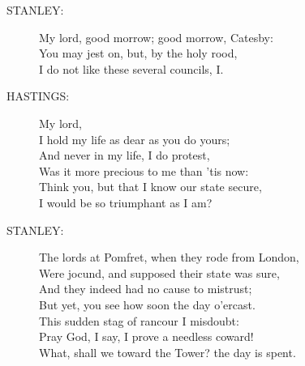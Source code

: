 \documentclass{article}
\begin{document}
\begin{description}
\item[STANLEY:] 
\hspace{1pt}My lord, good morrow; good morrow, Catesby:\\
\hspace{1pt}You may jest on, but, by the holy rood,\\
\hspace{1pt}I do not like these several councils, I.\\
\end{description}
\begin{description}
\item[HASTINGS:] 
\hspace{1pt}My lord,\\
\hspace{1pt}I hold my life as dear as you do yours;\\
\hspace{1pt}And never in my life, I do protest,\\
\hspace{1pt}Was it more precious to me than 'tis now:\\
\hspace{1pt}Think you, but that I know our state secure,\\
\hspace{1pt}I would be so triumphant as I am?\\
\end{description}
\begin{description}
\item[STANLEY:] 
\hspace{1pt}The lords at Pomfret, when they rode from London,\\
\hspace{1pt}Were jocund, and supposed their state was sure,\\
\hspace{1pt}And they indeed had no cause to mistrust;\\
\hspace{1pt}But yet, you see how soon the day o'ercast.\\
\hspace{1pt}This sudden stag of rancour I misdoubt:\\
\hspace{1pt}Pray God, I say, I prove a needless coward!\\
\hspace{1pt}What, shall we toward the Tower? the day is spent.\\
\end{description}
\end{document}
